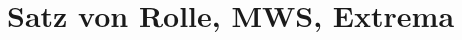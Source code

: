 \documentclass[main.tex]{subfiles}
\begin{document}
\section*{Satz von Rolle, MWS, Extrema}
\begin{karte}{}

\end{karte}
\begin{karte}{}

\end{karte}
\begin{karte}{}

\end{karte}
\begin{karte}{}

\end{karte}
\begin{karte}{}

\end{karte}
\begin{karte}{}

\end{karte}
\begin{karte}{}

\end{karte}
\begin{karte}{}

\end{karte}
\begin{karte}{}

\end{karte}
\begin{karte}{}

\end{karte}
\end{document}

